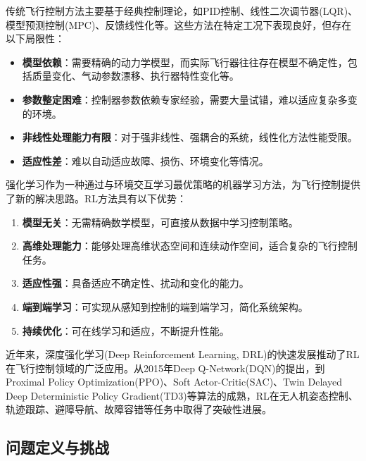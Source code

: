 \documentclass[12pt,a4paper]{ctexart}
\begin{document}
传统飞行控制方法主要基于经典控制理论，如PID控制、线性二次调节器(LQR)、模型预测控制(MPC)、反馈线性化等。这些方法在特定工况下表现良好，但存在以下局限性：

\begin{itemize}
    \item \textbf{模型依赖}：需要精确的动力学模型，而实际飞行器往往存在模型不确定性，包括质量变化、气动参数漂移、执行器特性变化等。
    
    \item \textbf{参数整定困难}：控制器参数依赖专家经验，需要大量试错，难以适应复杂多变的环境。
    
    \item \textbf{非线性处理能力有限}：对于强非线性、强耦合的系统，线性化方法性能受限。
    
    \item \textbf{适应性差}：难以自动适应故障、损伤、环境变化等情况。
\end{itemize}

强化学习作为一种通过与环境交互学习最优策略的机器学习方法，为飞行控制提供了新的解决思路。RL方法具有以下优势：

\begin{enumerate}
    \item \textbf{模型无关}：无需精确数学模型，可直接从数据中学习控制策略。
    
    \item \textbf{高维处理能力}：能够处理高维状态空间和连续动作空间，适合复杂的飞行控制任务。
    
    \item \textbf{适应性强}：具备适应不确定性、扰动和变化的能力。
    
    \item \textbf{端到端学习}：可实现从感知到控制的端到端学习，简化系统架构。
    
    \item \textbf{持续优化}：可在线学习和适应，不断提升性能。
\end{enumerate}

近年来，深度强化学习(Deep Reinforcement Learning, DRL)的快速发展推动了RL在飞行控制领域的广泛应用。从2015年Deep Q-Network(DQN)的提出，到Proximal Policy Optimization(PPO)、Soft Actor-Critic(SAC)、Twin Delayed Deep Deterministic Policy Gradient(TD3)等算法的成熟，RL在无人机姿态控制、轨迹跟踪、避障导航、故障容错等任务中取得了突破性进展。

\subsection{问题定义与挑战}
\end{document}

